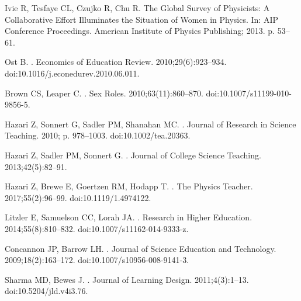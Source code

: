 \begin{thebibliography}{10}
Ivie R, Tesfaye CL, Czujko R, Chu R.
\newblock The Global Survey of Physicists: A Collaborative Effort Illuminates
  the Situation of Women in Physics.
\newblock In: AIP Conference Proceedings. {American Institute of Physics}
  Publishing; 2013. p. 53--61.

Ost B.
.
\newblock Economics of Education Review. 2010;29(6):923--934.
\newblock doi:{10.1016/j.econedurev.2010.06.011}.

Brown CS, Leaper C.
.
\newblock Sex Roles. 2010;63(11):860--870.
\newblock doi:{10.1007/s11199-010-9856-5}.

Hazari Z, Sonnert G, Sadler PM, Shanahan MC.
.
\newblock Journal of Research in Science Teaching. 2010; p. 978--1003.
\newblock doi:{10.1002/tea.20363}.

Hazari Z, Sadler PM, Sonnert G.
.
\newblock Journal of College Science Teaching. 2013;42(5):82--91.

Hazari Z, Brewe E, Goertzen RM, Hodapp T.
.
\newblock The Physics Teacher. 2017;55(2):96--99.
\newblock doi:{10.1119/1.4974122}.

Litzler E, Samuelson CC, Lorah JA.
.
\newblock Research in Higher Education. 2014;55(8):810--832.
\newblock doi:{10.1007/s11162-014-9333-z}.

Concannon JP, Barrow LH.
.
\newblock Journal of Science Education and Technology. 2009;18(2):163--172.
\newblock doi:{10.1007/s10956-008-9141-3}.

Sharma MD, Bewes J.
.
\newblock Journal of Learning Design. 2011;4(3):1--13.
\newblock doi:{10.5204/jld.v4i3.76}.


\end{thebibliography}
